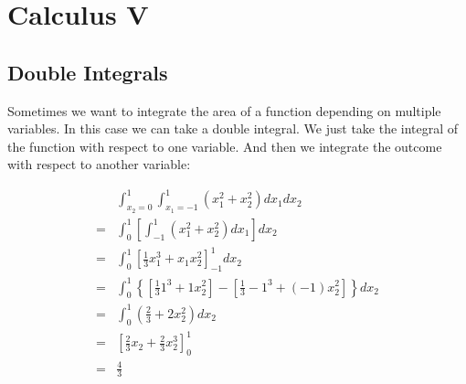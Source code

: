 \section{Calculus V}

\subsection{Double Integrals}

Sometimes we want to integrate the area of a function depending on multiple variables. In this case we can take a double integral. We just take the integral of the function with respect to one variable. And then we integrate the outcome with respect to another variable:

\begin{align*}
    & \int_{x_2 = 0}^1 \int_{x_1 = -1}^1 (x_1^2 + x_2^2) d x_1 d x_2 \\
    = & \int_0^1 \left[\int_{-1}^1 (x_1^2 + x_2^2) d x_1 \right]d x_2 \\
    = & \int_0^1 \left[ \frac{1}{3}x_1^3 + x_1x_2^2 \right]_{-1}^1 d x_2 \\
    = & \int_0^1 \left\{\left[ \frac{1}{3}1^3 + 1x_2^2 \right]
        - \left[\frac{1}{3}-1^3 + (-1)x_2^2\right]\right\}d x_2 \\
    = & \int_0^1 \left(\frac{2}{3} + 2x_2^2\right) d x_2 \\
    = & \left[\frac{2}{3}x_2 + \frac{2}{3}x_2^3\right]_0^1 \\
    = & \frac{4}{3}
\end{align*}
